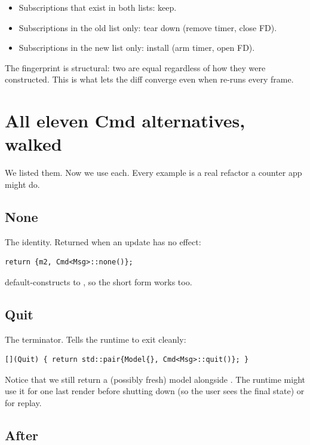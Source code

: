 \begin{itemize}[leftmargin=*]
  \item Subscriptions that exist in both lists: keep.
  \item Subscriptions in the old list only: tear down (remove
    timer, close FD).
  \item Subscriptions in the new list only: install (arm timer,
    open FD).
\end{itemize}

The fingerprint is structural: two 
are equal regardless of how they were constructed. This is what
lets the diff converge even when  re-runs every frame.

\section{All eleven Cmd alternatives, walked}

We listed them. Now we use each. Every example is a real
refactor a counter app might do.

\subsection*{None}

The identity. Returned when an update has no effect:

\begin{lstlisting}
return {m2, Cmd<Msg>::none()};
\end{lstlisting}

 default-constructs to , so the
short form  works too.

\subsection*{Quit}

The terminator. Tells the runtime to exit cleanly:

\begin{lstlisting}
[](Quit) { return std::pair{Model{}, Cmd<Msg>::quit()}; }
\end{lstlisting}

Notice that we still return a (possibly fresh) model alongside
. The runtime might use it for one last render before
shutting down (so the user sees the final state) or for replay.

\subsection*{After}

